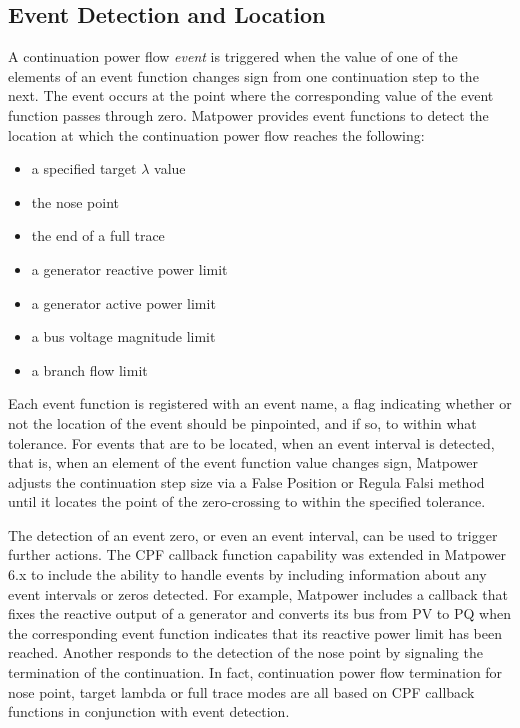 \documentclass[12pt]{article}
\newcommand{\matpower}[0]{{\sc Matpower}}
\numberwithin{equation}{section}
\numberwithin{table}{section}
\numberwithin{figure}{section}
\begin{document}
\subsection{Event Detection and Location}
A continuation power flow \emph{event} is triggered when the value of one of the elements of an event function changes sign from one continuation step to the next. The event occurs at the point where the corresponding value of the event function passes through zero. \matpower{} provides event functions to detect the location at which the continuation power flow reaches the following:
\begin{itemize}
    \item a specified target $\lambda$ value
    \item the nose point
    \item the end of a full trace
    \item a generator reactive power limit
    \item a generator active power limit
    \item a bus voltage magnitude limit
    \item a branch flow limit
\end{itemize}

Each event function is registered with an event name, a flag indicating whether or not the location of the event should be pinpointed, and if so, to within what tolerance. For events that are to be located, when an event interval is detected, that is, when an element of the event function value changes sign, \matpower{} adjusts the continuation step size via a False Position or Regula Falsi method until it locates the point of the zero-crossing to within the specified tolerance.

The detection of an event zero, or even an event interval, can be used to trigger further actions. The CPF callback function capability was extended in \matpower{} 6.x to include the ability to handle events by including information about any event intervals or zeros detected. For example, \matpower{} includes a callback that fixes the reactive output of a generator and converts its bus from PV to PQ when the corresponding event function indicates that its reactive power limit has been reached. Another responds to the detection of the nose point by signaling the termination of the continuation. In fact, continuation power flow termination for nose point, target lambda or full trace modes are all based on CPF callback functions in conjunction with event detection.
\end{document}
